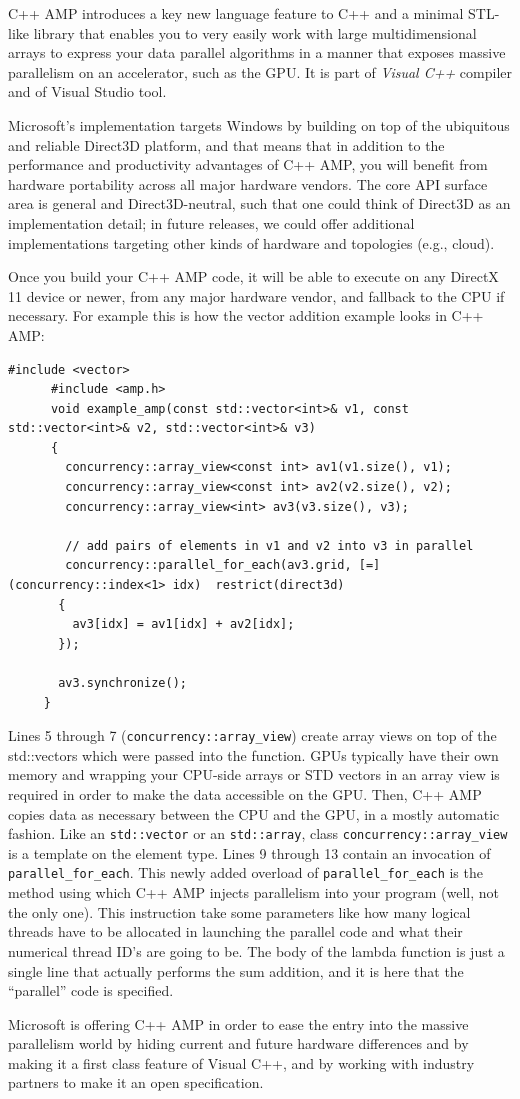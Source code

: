 C++ AMP introduces a key new language feature to C++ and a minimal STL-like
library that enables you to very easily work with large multidimensional arrays
to express your data parallel algorithms in a manner that exposes massive
parallelism on an accelerator, such as the GPU.
 It is part of \textit{Visual C++} compiler and of Visual Studio tool. 

Microsoft's implementation targets Windows by building on top of the ubiquitous
and reliable Direct3D platform, and that means that in addition to the
performance and productivity advantages of C++ AMP, you will benefit from
hardware portability across all major hardware vendors. The core API surface
area is general and Direct3D-neutral, such that one could think of Direct3D as
an implementation detail; in future releases, we could offer additional
implementations targeting other kinds of hardware and topologies (e.g., cloud).

Once you build your C++ AMP code, it will be able to execute on any DirectX 11
device or newer, from any major hardware vendor, and fallback to the CPU
if necessary. 
For example this is how the vector addition example looks in C++ AMP:

\begin{lstlisting}
#include <vector>
	  #include <amp.h>
	  void example_amp(const std::vector<int>& v1, const std::vector<int>& v2, std::vector<int>& v3)
	  {
	    concurrency::array_view<const int> av1(v1.size(), v1);
	    concurrency::array_view<const int> av2(v2.size(), v2);  
	    concurrency::array_view<int> av3(v3.size(), v3);  
	
	    // add pairs of elements in v1 and v2 into v3 in parallel 
	    concurrency::parallel_for_each(av3.grid, [=] (concurrency::index<1> idx)  restrict(direct3d)
	   {
	     av3[idx] = av1[idx] + av2[idx]; 
	   });
	
	   av3.synchronize();
	 }

\end{lstlisting}


Lines 5 through 7 (\texttt{concurrency::array\_view}) create array views on top
of the std::vectors which were passed into the function. GPUs typically have their own memory and wrapping your
CPU-side arrays or STD vectors in an array view is required in order to make the
data accessible on the GPU. Then, C++ AMP
copies data as necessary between the CPU and the GPU, in a mostly automatic
fashion. Like an \texttt{std::vector} or an \texttt{std::array}, class
\texttt{concurrency::array\_view} is a template on the element type. 
Lines 9 through 13 contain an invocation of \texttt{parallel\_for\_each}. This
newly added overload of \texttt{parallel\_for\_each} is the method using which C++ AMP injects
parallelism into your program (well, not the only one).  This instruction take
some parameters like how many logical threads have to be allocated in launching the parallel code and
what their numerical thread ID’s are going to be. The body of the lambda
function is just a single line that actually performs the sum addition, and it
is here that the ``parallel'' code is specified.

Microsoft is offering C++ AMP in order to ease the entry into the massive
parallelism world by hiding current and future hardware differences and by
making it a first class feature of Visual C++, and
by working with industry partners to make it an open specification.



